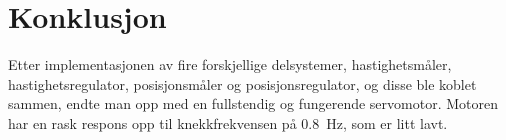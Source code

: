 \section{Konklusjon}\label{sec:konklusjon}

Etter implementasjonen av fire forskjellige delsystemer, hastighetsmåler, hastighetsregulator, posisjonsmåler og posisjonsregulator, og disse ble koblet sammen, endte man opp med en fullstendig og fungerende servomotor. 
Motoren har en rask respons opp til knekkfrekvensen på {\SI{0.8}{\hertz}}, som er litt lavt.

